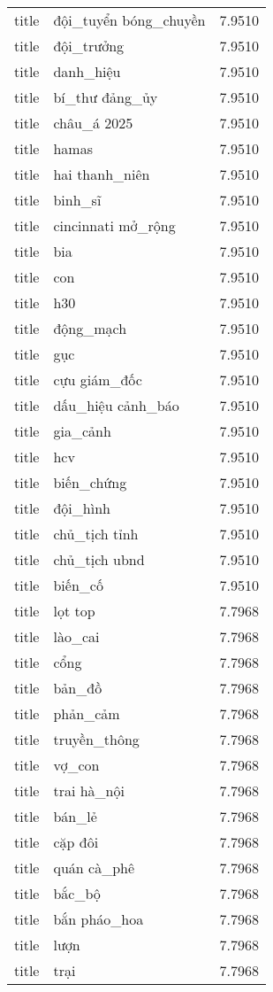 \documentclass{article}
\begin{document}
\begin{tabular}{lll}
title & đội\_tuyển bóng\_chuyền & 7.9510\\
title & đội\_trưởng & 7.9510\\
title & danh\_hiệu & 7.9510\\
title & bí\_thư đảng\_ủy & 7.9510\\
title & châu\_á 2025 & 7.9510\\
title & hamas & 7.9510\\
title & hai thanh\_niên & 7.9510\\
title & binh\_sĩ & 7.9510\\
title & cincinnati mở\_rộng & 7.9510\\
title & bia & 7.9510\\
title & con & 7.9510\\
title & h30 & 7.9510\\
title & động\_mạch & 7.9510\\
title & gục & 7.9510\\
title & cựu giám\_đốc & 7.9510\\
title & dấu\_hiệu cảnh\_báo & 7.9510\\
title & gia\_cảnh & 7.9510\\
title & hcv & 7.9510\\
title & biến\_chứng & 7.9510\\
title & đội\_hình & 7.9510\\
title & chủ\_tịch tỉnh & 7.9510\\
title & chủ\_tịch ubnd & 7.9510\\
title & biến\_cố & 7.9510\\
title & lọt top & 7.7968\\
title & lào\_cai & 7.7968\\
title & cổng & 7.7968\\
title & bản\_đồ & 7.7968\\
title & phản\_cảm & 7.7968\\
title & truyền\_thông & 7.7968\\
title & vợ\_con & 7.7968\\
title & trai hà\_nội & 7.7968\\
title & bán\_lẻ & 7.7968\\
title & cặp đôi & 7.7968\\
title & quán cà\_phê & 7.7968\\
title & bắc\_bộ & 7.7968\\
title & bắn pháo\_hoa & 7.7968\\
title & lượn & 7.7968\\
title & trại & 7.7968\\

\end{tabular}
\end{document}
